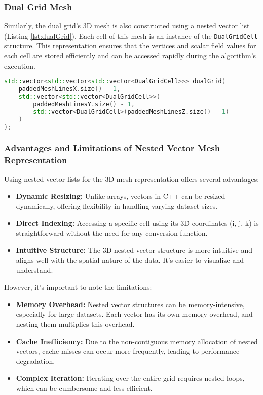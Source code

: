 \subsubsection{Dual Grid Mesh} \label{Dual-Grid-Mesh}

Similarly, the dual grid's 3D mesh is also constructed using a nested vector list (Listing \ref{lst:dualGrid}). Each cell of this mesh is an instance of the \texttt{DualGridCell} structure. This representation ensures that the vertices and scalar field values for each cell are stored efficiently and can be accessed rapidly during the algorithm's execution.

\vspace{2mm}
\begin{lstlisting}[language=C++, caption=3D Mesh Representation Using Dual Grid Cells, label=lst:dualGrid]
std::vector<std::vector<std::vector<DualGridCell>>> dualGrid(
    paddedMeshLinesX.size() - 1,
    std::vector<std::vector<DualGridCell>>(
        paddedMeshLinesY.size() - 1,
        std::vector<DualGridCell>(paddedMeshLinesZ.size() - 1)
    )
);
\end{lstlisting}

\subsubsection{Advantages and Limitations of Nested Vector Mesh Representation}

Using nested vector lists for the 3D mesh representation offers several advantages:

\begin{itemize}
    \item \textbf{Dynamic Resizing:} Unlike arrays, vectors in C++ can be resized dynamically, offering flexibility in handling varying dataset sizes.
    \item \textbf{Direct Indexing:} Accessing a specific cell using its 3D coordinates (i, j, k) is straightforward without the need for any conversion function.
    \item \textbf{Intuitive Structure:} The 3D nested vector structure is more intuitive and aligns well with the spatial nature of the data. It's easier to visualize and understand.
\end{itemize}

However, it's important to note the limitations:

\begin{itemize}
    \item \textbf{Memory Overhead:} Nested vector structures can be memory-intensive, especially for large datasets. Each vector has its own memory overhead, and nesting them multiplies this overhead.
    \item \textbf{Cache Inefficiency:} Due to the non-contiguous memory allocation of nested vectors, cache misses can occur more frequently, leading to performance degradation.
    \item \textbf{Complex Iteration:} Iterating over the entire grid requires nested loops, which can be cumbersome and less efficient.
\end{itemize}

